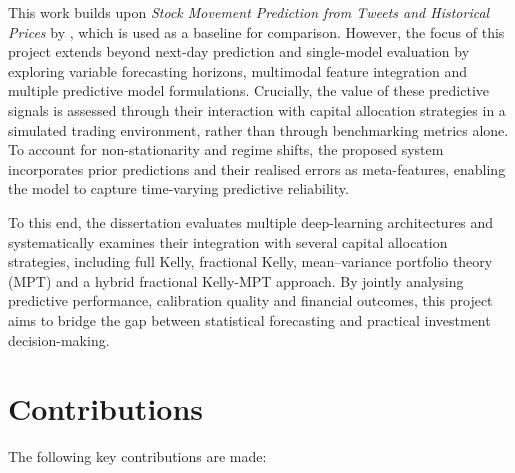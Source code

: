 \documentclass{l4proj}
\begin{document}
This work builds upon \textit{Stock Movement Prediction from Tweets and Historical Prices} by \cite{xu-cohen-2018-stock}, which is used as a baseline for comparison. However, the focus of this project extends beyond next-day prediction and single-model evaluation by exploring variable forecasting horizons, multimodal feature integration and multiple predictive model formulations. Crucially, the value of these predictive signals is assessed through their interaction with capital allocation strategies in a simulated trading environment, rather than through benchmarking metrics alone. To account for non-stationarity and regime shifts, the proposed system incorporates prior predictions and their realised errors as meta-features, enabling the model to capture time-varying predictive reliability.

To this end, the dissertation evaluates multiple deep-learning architectures and systematically examines their integration with several capital allocation strategies, including full Kelly, fractional Kelly, mean--variance portfolio theory (MPT) and a hybrid fractional Kelly-MPT approach. By jointly analysing predictive performance, calibration quality and financial outcomes, this project aims to bridge the gap between statistical forecasting and practical investment decision-making.
\section{Contributions}

The following key contributions are made:
\end{document}
